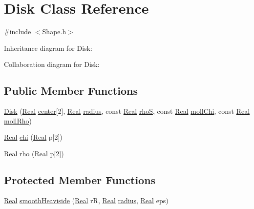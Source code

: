 \hypertarget{class_disk}{}\section{Disk Class Reference}
\label{class_disk}


{\ttfamily \#include $<$Shape.\+h$>$}



Inheritance diagram for Disk\+:


Collaboration diagram for Disk\+:
\subsection*{Public Member Functions}
\begin{DoxyCompactItemize}
\item 
\hyperlink{class_disk_a5ea7dc49cd7d0685989c63e64ab3b71f}{Disk} (\hyperlink{_h_d_f5_dumper_8h_a445a5f0e2a34c9d97d69a3c2d1957907}{Real} \hyperlink{class_shape_a865a04fe67fc785b3cbb44806a214248}{center}\mbox{[}2\mbox{]}, \hyperlink{_h_d_f5_dumper_8h_a445a5f0e2a34c9d97d69a3c2d1957907}{Real} \hyperlink{class_disk_ae6a9adac6c5dd96d63d0a3345f90499d}{radius}, const \hyperlink{_h_d_f5_dumper_8h_a445a5f0e2a34c9d97d69a3c2d1957907}{Real} \hyperlink{class_shape_a181acdc3063f20a15ba1807f7b6a5d10}{rho\+S}, const \hyperlink{_h_d_f5_dumper_8h_a445a5f0e2a34c9d97d69a3c2d1957907}{Real} \hyperlink{class_shape_ad7d270a8ffc4056d4990424dffdd0488}{moll\+Chi}, const \hyperlink{_h_d_f5_dumper_8h_a445a5f0e2a34c9d97d69a3c2d1957907}{Real} \hyperlink{class_shape_af5aa25175d49bc463fada7b11f2735e1}{moll\+Rho})
\item 
\hyperlink{_h_d_f5_dumper_8h_a445a5f0e2a34c9d97d69a3c2d1957907}{Real} \hyperlink{class_disk_afccc38b335adb2268cc7955da02da0f2}{chi} (\hyperlink{_h_d_f5_dumper_8h_a445a5f0e2a34c9d97d69a3c2d1957907}{Real} p\mbox{[}2\mbox{]})
\item 
\hyperlink{_h_d_f5_dumper_8h_a445a5f0e2a34c9d97d69a3c2d1957907}{Real} \hyperlink{class_disk_a55ef38503419802fe0b8feea43a3f215}{rho} (\hyperlink{_h_d_f5_dumper_8h_a445a5f0e2a34c9d97d69a3c2d1957907}{Real} p\mbox{[}2\mbox{]})
\end{DoxyCompactItemize}
\subsection*{Protected Member Functions}
\begin{DoxyCompactItemize}
\item 
\hyperlink{_h_d_f5_dumper_8h_a445a5f0e2a34c9d97d69a3c2d1957907}{Real} \hyperlink{class_disk_ab7f65af10857217606c73f7b598da9a4}{smooth\+Heaviside} (\hyperlink{_h_d_f5_dumper_8h_a445a5f0e2a34c9d97d69a3c2d1957907}{Real} r\+R, \hyperlink{_h_d_f5_dumper_8h_a445a5f0e2a34c9d97d69a3c2d1957907}{Real} \hyperlink{class_disk_ae6a9adac6c5dd96d63d0a3345f90499d}{radius}, \hyperlink{_h_d_f5_dumper_8h_a445a5f0e2a34c9d97d69a3c2d1957907}{Real} eps)
\end{DoxyCompactItemize}
